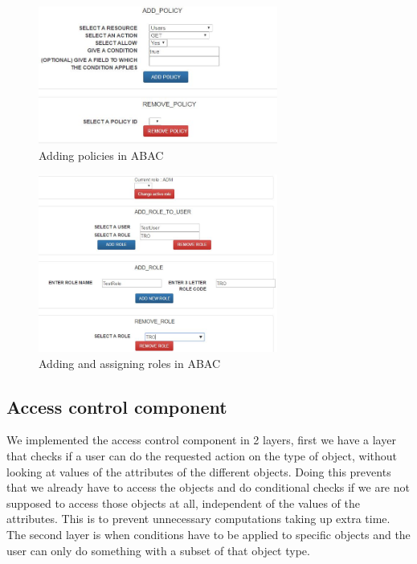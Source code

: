 \begin{figure}[h]
    \centering
    \includegraphics[width=0.7\textwidth]{Img/Tool/AddPolicies.JPG}
    \caption{Adding policies in ABAC}
\end{figure}
\clearpage
\begin{figure}[h]
    \centering
    \includegraphics[width=0.7\textwidth]{Img/Tool/ABACADD.JPG}
    \caption{Adding and assigning roles in ABAC}
\end{figure}

\subsection{Access control component}

We implemented the  access control component in 2 layers, first we have a layer that checks if a user can do the requested action on the type of object, without looking at values of the attributes of the different objects.
Doing this prevents  that we already have to access the objects and do conditional checks if we are not supposed to access those objects at all, independent of the values of the attributes.
This is to prevent unnecessary computations taking up extra time.
The second layer is when conditions have to be applied to specific objects and the user can only do something with a subset of that object type.

